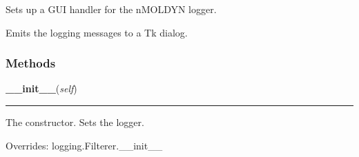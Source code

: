 Sets up a GUI handler for the nMOLDYN logger.

Emits the logging messages to a Tk dialog.



  \subsubsection{Methods}

    \vspace{0.5ex}

\hspace{.8\funcindent}\begin{boxedminipage}{\funcwidth}

    \raggedright \textbf{\_\_init\_\_}(\textit{self})

    \vspace{-1.5ex}

    \rule{\textwidth}{0.5\fboxrule}
\setlength{\parskip}{2ex}
    The constructor. Sets the logger.

\setlength{\parskip}{1ex}
      Overrides: logging.Filterer.\_\_init\_\_

    \end{boxedminipage}

    \vspace{0.5ex}

